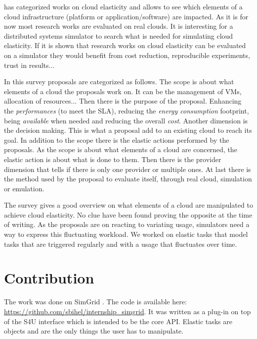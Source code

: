 \documentclass[a4paper, onecolumn]{article}
\begin{document}
  \cite{Naskos2016} has categorized works on cloud elasticity and allows to see
  which elements of a cloud infrastructure (platform or application/software)
  are impacted. As it is for now most research works are evaluated on real
  clouds. It is interesting for a distributed systems simulator to search what
  is needed for simulating cloud elasticity. If it is shown that research works
  on cloud elasticity can be evaluated on a simulator they would benefit from
  cost reduction, reproducible experiments, trust in results...
  
  In this survey proposals are categorized as follows. The scope is about what
  elements of a cloud the proposals work on. It can be the management of VMs,
  allocation of resources... Then there is the purpose of the proposal.
  Enhancing the \textit{performances} (to meet the SLA), reducing the
  \textit{energy consumption} footprint, being \textit{available} when needed
  and reducing the overall \textit{cost}. Another dimension is the decision
  making. This is what a proposal add to an existing cloud to reach its goal. In
  addition to the scope there is the elastic actions performed by the proposals.
  As the scope is about what elements of a cloud are concerned, the elastic
  action is about what is done to them. Then there is the provider dimension
  that tells if there is only one provider or multiple ones. At last there is
  the method used by the proposal to evaluate itself, through real cloud,
  simulation or emulation.
  
  The survey gives a good overview on what elements of a cloud are manipulated
  to achieve cloud elasticity. No clue have been found proving the opposite at
  the time of writing.
  As the proposals are on reacting to variating usage, simulators need a way to
  express this fluctuating workload. We worked on elastic tasks that model tasks
  that are triggered regularly and with a usage that fluctuates over time.


\section{Contribution} \label{contrib}
  The work was done on SimGrid \cite{casanova:hal-01017319}. The code is
  available here: \url{https://github.com/sbihel/internship_simgrid}. It was
  written as a plug-in on top of the S4U interface which is intended to be the
  core API. Elastic tasks are objects and are the only things the user has to
  manipulate.
  
\end{document}
